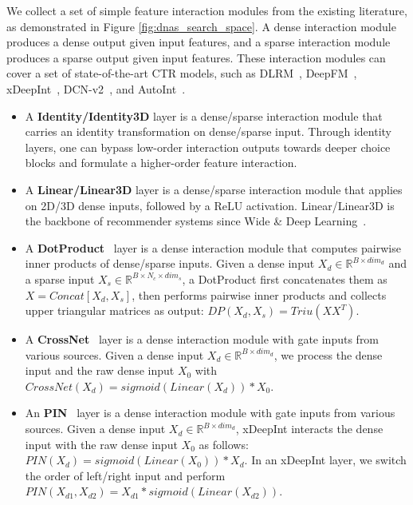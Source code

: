 We collect a set of simple feature interaction modules from the existing literature, as demonstrated in Figure \ref{fig:dnas_search_space}.
A dense interaction module produces a dense output given input features, and a sparse interaction module produces a sparse output given input features.
These interaction modules can cover a set of state-of-the-art CTR models, such as DLRM~\cite{naumov2019deep}, DeepFM~\cite{wang2017deep}, xDeepInt~\cite{yan2023xdeepint}, DCN-v2~\cite{wang2021dcn}, and AutoInt~\cite{song2019autoint}.
\begin{itemize}[noitemsep,leftmargin=*]
    \item A \textbf{Identity/Identity3D} layer is a dense/sparse interaction module that carries an identity transformation on dense/sparse input. Through identity layers, one can bypass low-order interaction outputs towards deeper choice blocks and formulate a higher-order feature interaction.

    \item A \textbf{Linear/Linear3D} layer is a dense/sparse interaction module that applies on 2D/3D dense inputs, followed by a ReLU activation.
    Linear/Linear3D is the backbone of recommender systems since Wide \& Deep Learning~\cite{cheng2016wide}.     

    \item A \textbf{DotProduct}~\cite{cheng2016wide,naumov2019deep} layer is a dense interaction module that computes pairwise inner products of dense/sparse inputs.
    Given a dense input $X_{d} \in \mathbb{R}^{B \times dim_{d}}$ and a sparse input $X_{s} \in \mathbb{R}^{B \times N_c \times dim_{s}}$, a DotProduct first concatenates them as $X = Concat[X_d, X_s]$, then performs pairwise inner products and collects upper triangular matrices as output: $DP(X_d, X_s)=Triu(XX^{T})$.

    \item A \textbf{CrossNet}~\cite{wang2021dcn} layer is a dense interaction module with gate inputs from various sources. 
    Given a dense input $X_{d}\in \mathbb{R}^{B \times dim_{d}}$, we process the dense input and the raw dense input $X_0$ with $CrossNet(X_{d}) = sigmoid(Linear(X_d)) * X_{0}$.

    \item An \textbf{PIN}~\cite{yan2023xdeepint} layer is a dense interaction module with gate inputs from various sources. 
    Given a dense input $X_{d}\in \mathbb{R}^{B \times dim_{d}}$, xDeepInt interacts the dense input with the raw dense input $X_0$ as follows: $PIN(X_{d}) = sigmoid(Linear(X_{0})) * X_{d}$.
    In an xDeepInt layer, we switch the order of left/right input and perform $PIN(X_{d1}, X_{d2}) = X_{d1} * sigmoid(Linear(X_{d2}))$.


\end{itemize}
